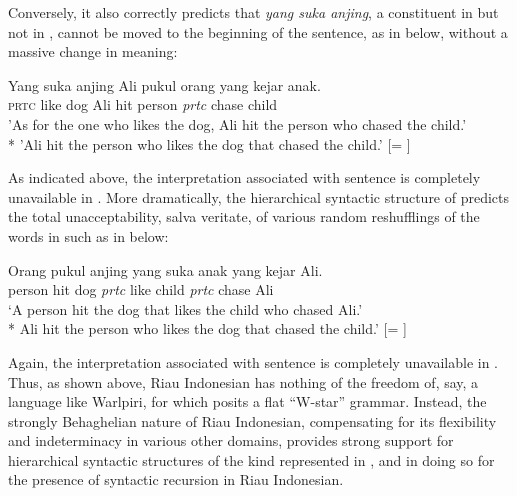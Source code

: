 \documentclass[output=paper,colorlinks,citecolor=brown
]{langscibook}
\begin{document}
Conversely, it also correctly predicts that \textit{yang suka anjing}, a constituent in  but not in , cannot be moved to the beginning of the sentence, as in  below, without a massive change in meaning:

\ea \label{ex:gil:3}
\gll Yang	suka	anjing	Ali	pukul	orang	yang	kejar	anak.\\
 \textsc{prtc}	like	dog	Ali	hit	person	\textit{prtc}	chase	child\\
\glt 'As for the one who likes the dog, Ali hit the person who chased the child.' \\
*	'Ali hit the person who likes the dog that chased the child.' [= ]
\z

As indicated above, the interpretation associated with sentence  is completely unavailable in .  More dramatically, the hierarchical syntactic structure of  predicts the total unacceptability, salva veritate, of various random reshufflings of the words in  such as in  below:

\ea \label{ex:gil:4}
\gll Orang	pukul	anjing	yang	suka	anak	yang	kejar	Ali. \\
    person	hit	dog	\textit{prtc}	like	child	\textit{prtc}	chase	Ali\\
\glt `A person hit the dog that likes the child who chased Ali.' \\
*	Ali hit the person who likes the dog that chased the child.' [= ]
\z

Again, the interpretation associated with sentence  is completely unavailable in .  Thus, as shown above, Riau Indonesian has nothing of the freedom of, say, a language like Warlpiri, for which \citet{hale1979position, hale1983warlpiri} posits a flat ``W-star'' grammar. Instead, the strongly Behaghelian nature of Riau Indonesian, compensating for its flexibility and indeterminacy in various other domains, provides strong support for hierarchical syntactic structures of the kind represented in , and in doing so for the presence of syntactic recursion in Riau Indonesian.
\end{document}

